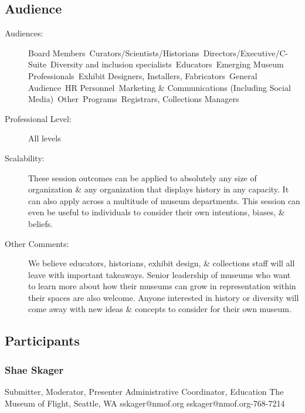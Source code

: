 \documentclass{report}
\begin{document}
              \subsection*{Audience}
                \begin{description}
                  \item [Audiences:]Board Members~Curators/Scientists/Historians~Directors/Executive/C-Suite~Diversity and inclusion specialists~Educators~Emerging Museum Professionals~Exhibit Designers, Installers, Fabricators~General Audience~HR Personnel~Marketing \& Communications (Including Social Media)~Other~Programs~Registrars, Collections Managers~
                  \item[Professional Level:]All levels~
                \item[Scalability:] These session outcomes can be applied to absolutely any size of organization \& any organization that displays history in any capacity. It can also apply across a multitude of museum departments. This session can even be useful to individuals to consider their own intentions, biases, \& beliefs.

							
              \item[Other Comments:] We believe educators, historians, exhibit design, \& collections staff will all leave with important takeaways. Senior leadership of museums who want to learn more about how their museums can grow in representation within their spaces are also welcome. Anyone interested in history or diversity will come away with new ideas \& concepts to consider for their own museum.
              \end{description}
            \subsection*{Participants}
              \subsubsection*{ Shae Skager }
              Submitter, Moderator, Presenter\newline
              Administrative Coordinator, Education\newline
              The Museum of Flight, Seattle, WA
              \newline
              sskager@nmof.org\newline
              sskager@nmof.org-768-7214\newline
\end{document}
